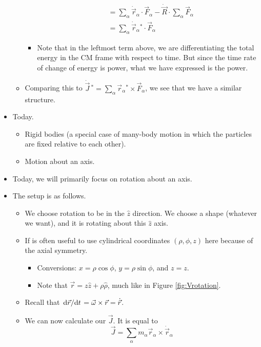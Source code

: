 \documentclass[../notes.tex]{subfiles}
\begin{document}
\begin{itemize}
\begin{itemize}
\begin{itemize}
\begin{align*}
                &= \sum_\alpha\dot{\vec{r}}_\alpha\cdot\vec{F}_\alpha-\dot{\vec{R}}\cdot\sum_\alpha\vec{F}_\alpha\\
                &= \sum_\alpha\dot{\vec{r}}_\alpha{}^*\cdot\vec{F}_\alpha
            \end{align*}
            \item Note that in the leftmost term above, we are differentiating the total energy in the CM frame with respect to time. But since the time rate of change of energy is power, what we have expressed is the power.
        \end{itemize}
        \item Comparing this to $\dot{\vec{J}}{\,}^*=\sum_\alpha\vec{r}_\alpha{}^*\times\vec{F}_\alpha$, we see that we have a similar structure.
    \end{itemize}
    \item Today.
    \begin{itemize}
        \item Rigid bodies (a special case of many-body motion in which the particles are fixed relative to each other).
        \item Motion about an axis.
    \end{itemize}
    \item Today, we will primarily focus on rotation about an axis.
    \item The setup is as follows.
    \begin{itemize}
        \item We choose rotation to be in the $\hat{z}$ direction. We choose a shape (whatever we want), and it is rotating about this $\hat{z}$ axis.
        \item If is often useful to use cylindrical coordinates $(\rho,\phi,z)$ here because of the axial symmetry.
        \begin{itemize}
            \item Conversions: $x=\rho\cos\phi$, $y=\rho\sin\phi$, and $z=z$.
            \item Note that $\vec{r}=z\hat{z}+\rho\hat{\rho}$, much like in Figure \ref{fig:Vrotation}.
        \end{itemize}
        \item Recall that $\dv*{\vec{r}}{t}=\vec{\omega}\times\vec{r}=\dot{\vec{r}}$.
        \item We can now calculate our $\vec{J}$. It is equal to
        \begin{equation*}
            \vec{J} = \sum_\alpha m_\alpha\vec{r}_\alpha\times\dot{\vec{r}}_\alpha

\end{equation*}
\end{itemize}
\end{itemize}
\end{document}
